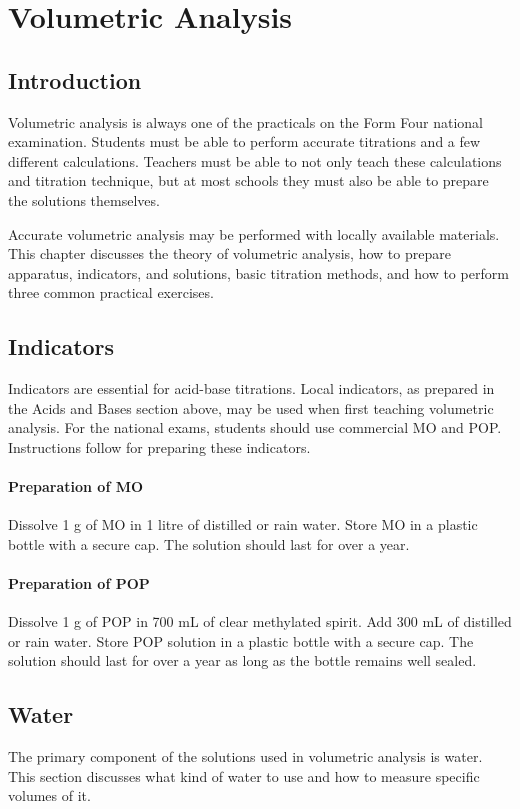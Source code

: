 
\chapter{Volumetric Analysis}
\section{Introduction}

Volumetric analysis is always one of the practicals on the Form Four national examination. Students must be able to perform accurate titrations and a few different calculations. Teachers must be able to not only teach these calculations and titration technique, but at most schools they must also be able to prepare the solutions themselves.

Accurate volumetric analysis may be performed with locally available materials. This chapter discusses the theory of volumetric analysis, how to prepare apparatus, indicators, and solutions, basic titration methods, and how to perform three common practical exercises.


\section{Indicators}

Indicators are essential for acid-base titrations. Local indicators, as prepared in the Acids and Bases section above, may be used when first teaching volumetric analysis. For the national exams, students should use commercial MO and POP. Instructions follow for preparing these indicators.

\subsubsection{Preparation of MO}
Dissolve 1 g of MO in 1 litre of distilled or rain water. Store MO in a plastic bottle with a secure cap. The solution should last for over a year.

\subsubsection{Preparation of POP}
Dissolve 1 g of POP in 700 mL of clear methylated spirit. Add 300 mL of distilled or rain water. Store POP solution in a plastic bottle with a secure cap. The solution should last for over a year as long as the bottle remains well sealed.

\section{Water}
The primary component of the solutions used in volumetric analysis is water. This section discusses what kind of water to use and how to measure specific volumes of it.

